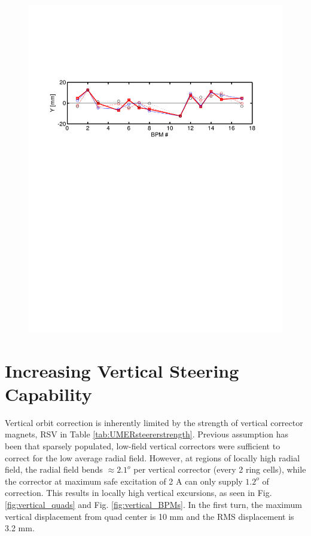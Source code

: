 \begin{figure}[h]
{	\includegraphics[width=\textwidth,trim={.5in 6.5in .5in 2.4in}, clip]{4.figures/BPM_position_sol151116_Y.pdf}}
\end{figure}


\section{Increasing Vertical Steering Capability} \label{sec:steering:SSV}

Vertical orbit correction is inherently limited by the strength of vertical corrector magnets, RSV in Table \ref{tab:UMERsteererstrength}.
Previous assumption has been that sparsely populated, low-field vertical correctors were sufficient to correct for the low average radial field. However, at regions of locally high radial field, the radial field bends $\approx 2.1^o$ per vertical corrector (every 2 ring cells), while the corrector at maximum safe excitation of 2 A can only supply $1.2^o$ of correction. This results in locally high vertical excursions, as seen in Fig. \ref{fig:vertical_quads} and Fig. \ref{fig:vertical_BPMs}. In the first turn, the maximum vertical displacement from quad center is 10 mm and the RMS displacement is 3.2 mm. 

